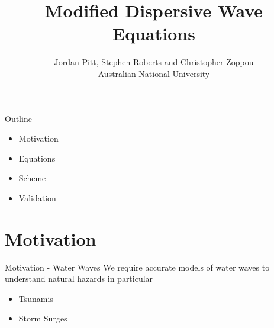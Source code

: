 \documentclass[pdf]{beamer}
\title{Modified Dispersive Wave Equations}
\author{Jordan Pitt, Stephen Roberts and Christopher Zoppou \\ Australian National University}
\begin{document}
	
\begin{frame}[plain]{}
\end{frame}
	
	
\begin{frame}
\titlepage
\end{frame}
	


\begin{frame}{Outline}
	\begin{itemize}
		\item Motivation
		\item Equations
		\item Scheme
		\item Validation
	\end{itemize}
\end{frame}
\section{Motivation}
\begin{frame}{Motivation - Water Waves}
We require accurate models of water waves to understand natural hazards in particular
	\begin{itemize}
		\item Tsunamis
		\item Storm Surges
	\end{itemize}
\end{frame}
\end{document}
